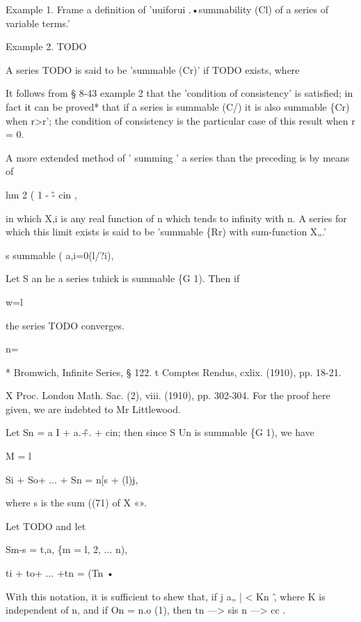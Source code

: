 Example 1. Frame a definition of 'uuiforui .•summability (Cl) of a
series of variable terms.'

Example 2. TODO


A series TODO is said to be 'summable (Cr)' if TODO exists, where

It follows from § 8-43 example 2 that the 'condition of consistency'
is satisfied; in fact it can be proved* that if a series is summable
(C/) it is also summable \{Cr) when r>r'; the condition of consistency
is the particular case of this result when r = 0.


A more extended method of ' summing ' a series than the preceding is
by means of

hm 2 ( 1 - \^- cin ,

in which X,i is any real function of n which tends to infinity with n.
A series for which this limit exists is said to be 'summable \{Rr)
with sum-function X„.'


s summable ( a,i=0(l/?i),

Let S an he a series tuhick is summable \{G 1). Then if

w=l

the series TODO converges.

n=\

* Bromwich, Infinite Series, § 122. t Comptes Rendus, cxlix. (1910),
pp. 18-21.

X Proc. London Math. Sac. (2), viii. (1910), pp. 302-304. For the
proof here given, we are indebted to Mr Littlewood.

Let Sn = a I + a.\^ +. + cin; then since S Un is summable \{G 1), we
have

% 
% 

M = l

Si + So+ ... + Sn = n[s + (l)j,

where s is the sum ((71) of X «».

Let TODO and let

Sm-s = t,a, \{m = l, 2, ... n),

ti + to+ ... +tn = (Tn •

With this notation, it is sufficient to shew that, if j a„ | < Kn~\^,
where K is independent of n, and if On = n.o (1), then tn —> sis n —>
cc .

